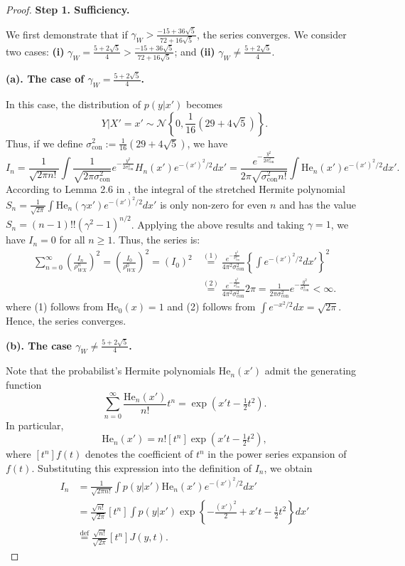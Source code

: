 \documentclass[
  12pt]{article}
\def\cN{\mathcal{N}}
\begin{document}
\begin{proof}
\noindent\textbf{Step 1. Sufficiency.} 

We first demonstrate that if $\gamma_W > \frac{-15 + 36\sqrt{5}}{72 + 16\sqrt{5}}$, the series converges. We consider two cases: \textbf{(i)} $\gamma_W =\frac{5+2\sqrt{5}}{4} > \frac{-15 + 36\sqrt{5}}{72 + 16\sqrt{5}}$; and \textbf{(ii)} $\gamma_W \neq \frac{5+2\sqrt{5}}{4}$. 

\noindent\textbf{(a). The case of $\gamma_W =\frac{5+2\sqrt{5}}{4}$.}

In this case, the distribution of $p(y|x')$ becomes
$$
Y|X'=x'\sim \cN\left\{ 0,\frac{1}{16}( 29+4\sqrt{5} ) \right\}.
$$
Thus, if we define $\sigma^2_{\mathrm{con}}:=\frac{1}{16}( 29+4\sqrt{5} )$, we have
$$
I_n=\frac{1}{\sqrt{2\pi n!}}\int{\frac{1}{\sqrt{2\pi \sigma_{\mathrm{con}}^{2}}}e^{-\frac{y^2}{2\sigma_{\mathrm{con}}^{2}}}H_n(x')e^{-(x')^2/2}dx'=\frac{e^{-\frac{y^2}{2\sigma_{\mathrm{con}}^{2}}}}{2\pi \sqrt{\sigma^2_{\mathrm{con}}n!}}\int{\mathrm{He}_n(x')e^{-(x')^2/2}dx'}}.
$$
According to Lemma 2.6 in \cite{davis2024general}, the integral of the stretched Hermite polynomial $S_n=\frac{1}{\sqrt{2\pi}}\int{\mathrm{He}_n(\gamma x')e^{-(x')^2/2}dx'}$ is only non-zero for even $n$ and has the value $S_n=(n-1)!!(\gamma^2-1)^{n/2}$. Applying the above results and taking $\gamma=1$, we have $I_n=0$ for all $n\ge 1$. Thus, the series is:
\begin{align*}
    \sum_{n=0}^{\infty}{\left( \frac{I_n}{\rho_{WX}^{n}} \right)^2}=\left( \frac{I_0}{\rho_{WX}^{0}} \right)^2=\left( I_0 \right)^2 & \overset{(1)}{=} \frac{e^{-\frac{y^2}{\sigma_{\mathrm{con}}^{2}}}}{4\pi^2 \sigma_{\mathrm{con}}^{2}}\left\{ \int{e^{-(x')^2/2}dx'} \right\}^2 \\
    & \overset{(2)}{=}\frac{e^{-\frac{y^2}{\sigma_{\mathrm{con}}^{2}}}}{4\pi^2 \sigma_{\mathrm{con}}^{2}} 2\pi =\frac{1}{2\pi \sigma_{\mathrm{con}}^{2}}e^{-\frac{y^2}{\sigma_{\mathrm{con}}^{2}}}<\infty.
\end{align*}
where (1) follows from $\mathrm{He}_0(x)=1$ and (2) follows from $\int{e^{-x^2/2}dx}=\sqrt{2\pi}$. Hence, the series converges.

\noindent\textbf{(b). The case $\gamma_W \neq \frac{5+2\sqrt{5}}{4}$.}

Note that the probabilist's Hermite polynomials $\mathrm{He}_n(x')$ admit the generating function
$$
\sum_{n=0}^{\infty} \frac{\mathrm{He}_n(x')}{n!} t^n = \exp\left(x' t - \tfrac{1}{2} t^2\right).
$$
In particular,
$$
\mathrm{He}_n(x') = n!  [t^n] \exp\left(x' t - \tfrac{1}{2} t^2\right),
$$
where $[t^n] f(t)$ denotes the coefficient of $t^n$ in the power series expansion of $f(t)$. Substituting this expression into the definition of $I_n$, we obtain
\begin{align*}
    I_n &= \frac{1}{\sqrt{2\pi n!}} \int p(y | x') \mathrm{He}_n(x') e^{-(x')^2/2}  dx' \\
    &= \frac{\sqrt{n!}}{\sqrt{2\pi}}  [t^n] \int p(y | x') \exp\left\{-\tfrac{(x')^2}{2} + x' t - \tfrac{1}{2} t^2 \right\} dx'\\
    & \overset{\mathrm{def}}{=} \frac{\sqrt{n!}}{\sqrt{2\pi}}  [t^n] J(y,t).
\end{align*}


\end{proof}
\end{document}
